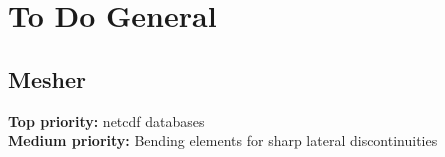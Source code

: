 \documentclass[11pt,letter,fleqn,english,notitlepage]{article}
\begin{document}

\newpage



\section{To Do General}
\subsection{Mesher}

\textbf{Top priority:} netcdf databases\\

\noindent\textbf{Medium priority:} Bending elements for sharp lateral discontinuities\\
\end{document}
